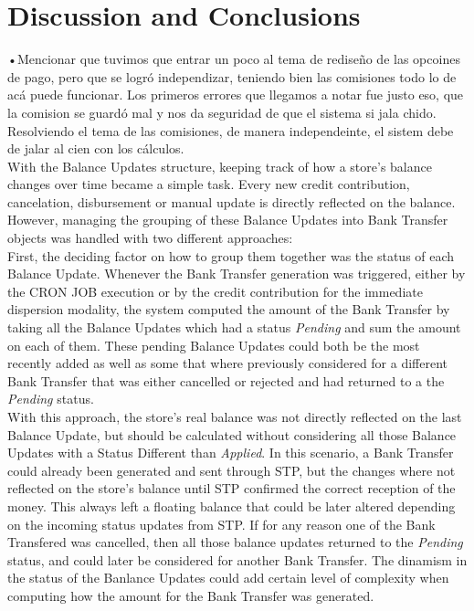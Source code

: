 
\chapter{Discussion and Conclusions}

•Mencionar que tuvimos que entrar un poco al tema de rediseño de las opcoines de pago, pero que se logró independizar, teniendo bien las comisiones todo lo de acá puede funcionar. Los primeros errores que llegamos a notar fue justo eso, que la comision se guardó mal y nos da seguridad de que el sistema si jala chido. Resolviendo el tema de las comisiones, de manera independeinte, el sistem debe de jalar al cien con los cálculos. \\

With the Balance Updates structure, keeping track of how a store's balance changes over time became a simple task. Every new credit contribution, cancelation, disbursement or manual update is directly reflected on the balance. However, managing the grouping of these Balance Updates into Bank Transfer objects was handled with two different approaches:\\

First, the deciding factor on how to group them together was the status of each Balance Update. Whenever the Bank Transfer generation was triggered, either by the CRON JOB execution or by the credit contribution for the immediate dispersion modality, the system computed the amount of the Bank Transfer by taking all the Balance Updates which had a status \textit{Pending} and sum the amount on each of them. These pending Balance Updates could both be the most recently added as well as some that where previously considered for a different Bank Transfer that was either cancelled or rejected and had returned to a the \textit{Pending }status.\\ 

With this approach, the store's real balance was not directly reflected on the last Balance Update, but should be calculated without considering all those Balance Updates with a Status Different than \textit{Applied}. In this scenario, a Bank Transfer could already been generated and sent through STP, but the changes where not reflected on the store's balance until STP confirmed the correct reception of the money. This always left a floating balance that could be later altered depending on the incoming status updates from STP. If for any reason one of the Bank Transfered was cancelled, then all those balance updates returned to the \textit{Pending} status, and could later be considered for another Bank Transfer. The dinamism in the status of the Banlance Updates could add certain level of complexity when computing how the amount for the Bank Transfer was generated.\\ 

